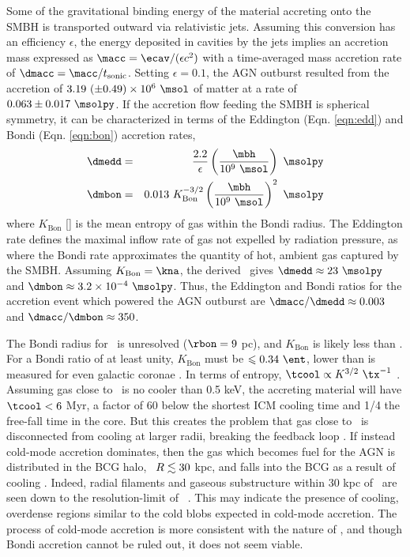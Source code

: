 \documentclass[useAMS,usenatbib]{mn2e}
\begin{document}
Some of the gravitational binding energy of the material accreting
onto the SMBH is transported outward via relativistic jets. Assuming
this conversion has an efficiency $\epsilon$, the energy deposited in
cavities by the jets implies an accretion mass expressed as $\macc =
\ecav/(\epsilon c^2)$ with a time-averaged mass accretion rate of
$\dmacc = \macc/t_{\mathrm{sonic}}$. Setting $\epsilon = 0.1$, the AGN
outburst resulted from the accretion of $3.19 ~(\pm 0.49) \times
10^{6} ~\msol$ of matter at a rate of $0.063 \pm 0.017 ~\msolpy$. If
the accretion flow feeding the SMBH is spherical symmetry, it can be
characterized in terms of the Eddington (Eqn. \ref{eqn:edd}) and Bondi
(Eqn. \ref{eqn:bon}) accretion rates,
\begin{eqnarray}
  \dmedd &=& \frac{2.2}{\epsilon} \left(\frac{\mbh}{10^9~\msol}\right)
  ~\msolpy  \label{eqn:edd}\\
  \dmbon &=& 0.013 ~K_{\mathrm{Bon}}^{-3/2} \left(\frac{\mbh}{10^9
    ~\msol}\right)^{2} ~\msolpy \label{eqn:bon}
\end{eqnarray}
where $K_{\mathrm{Bon}}$ [\ent] is the mean entropy of gas within the
Bondi radius. The Eddington rate defines the maximal inflow rate of
gas not expelled by radiation pressure, as where the Bondi rate
approximates the quantity of hot, ambient gas captured by the
SMBH. Assuming $K_{\mathrm{Bon}} = \kna$, the derived \mbh\ gives
$\dmedd \approx 23 ~\msolpy$ and $\dmbon \approx 3.2 \times 10^{-4}
~\msolpy$. Thus, the Eddington and Bondi ratios for the accretion
event which powered the AGN outburst are $\dmacc/\dmedd \approx 0.003$
and $\dmacc/\dmbon \approx 350$.

The Bondi radius for \irs\ is unresolved ($\rbon = 9$ pc), and
$K_{\mathrm{Bon}}$ is likely less than \kna. For a Bondi ratio of at
least unity, $K_{\mathrm{Bon}}$ must be $\le 0.34 ~\ent$, lower than
is measured for even galactic coronae \citep{coronae}. In terms of
entropy, $\tcool \propto K^{3/2} ~\tx^{-1}$ \citep{d06}. Assuming gas
close to \rbon\ is no cooler than 0.5 keV, the accreting material will
have $\tcool < 6$ Myr, a factor of 60 below the shortest ICM cooling
time and 1/4 the free-fall time in the core. But this creates the
problem that gas close to \rbon\ is disconnected from cooling at
larger radii, breaking the feedback loop
\citep{2006NewA...12...38S}. If instead cold-mode accretion dominates,
then the gas which becomes fuel for the AGN is distributed in the BCG
halo, \eg\ $R \lesssim 30$ kpc, and falls into the BCG as a result of
cooling \citep{pizzolato05, 2010arXiv1003.4181P}. Indeed, radial
filaments and gaseous substructure within 30 kpc of \irs\ are seen
down to the resolution-limit of
\hst\ \citep{1999Ap&SS.266..113A}. This may indicate the presence of
cooling, overdense regions similar to the cold blobs expected in
cold-mode accretion. The process of cold-mode accretion is more
consistent with the nature of \irs, and though Bondi accretion cannot
be ruled out, it does not seem viable.
\end{document}
